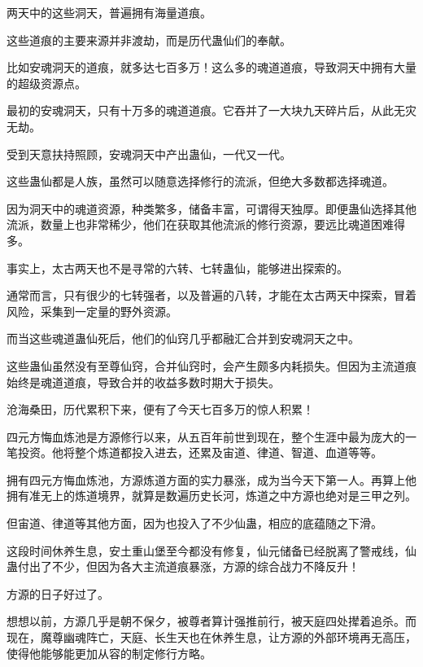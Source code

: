 
\begin{this_body}

两天中的这些洞天，普遍拥有海量道痕。

这些道痕的主要来源并非渡劫，而是历代蛊仙们的奉献。

比如安魂洞天的道痕，就多达七百多万！这么多的魂道道痕，导致洞天中拥有大量的超级资源点。

最初的安魂洞天，只有十万多的魂道道痕。它吞并了一大块九天碎片后，从此无灾无劫。

受到天意扶持照顾，安魂洞天中产出蛊仙，一代又一代。

这些蛊仙都是人族，虽然可以随意选择修行的流派，但绝大多数都选择魂道。

因为洞天中的魂道资源，种类繁多，储备丰富，可谓得天独厚。即便蛊仙选择其他流派，数量上也非常稀少，他们在获取其他流派的修行资源，要远比魂道困难得多。

事实上，太古两天也不是寻常的六转、七转蛊仙，能够进出探索的。

通常而言，只有很少的七转强者，以及普遍的八转，才能在太古两天中探索，冒着风险，采集到一定量的野外资源。

而当这些魂道蛊仙死后，他们的仙窍几乎都融汇合并到安魂洞天之中。

这些蛊仙虽然没有至尊仙窍，合并仙窍时，会产生颇多内耗损失。但因为主流道痕始终是魂道道痕，导致合并的收益多数时期大于损失。

沧海桑田，历代累积下来，便有了今天七百多万的惊人积累！

四元方悔血炼池是方源修行以来，从五百年前世到现在，整个生涯中最为庞大的一笔投资。他将整个炼道都投入进去，还累及宙道、律道、智道、血道等等。

拥有四元方悔血炼池，方源炼道方面的实力暴涨，成为当今天下第一人。再算上他拥有准无上的炼道境界，就算是数遍历史长河，炼道之中方源也绝对是三甲之列。

但宙道、律道等其他方面，因为也投入了不少仙蛊，相应的底蕴随之下滑。

这段时间休养生息，安土重山堡至今都没有修复，仙元储备已经脱离了警戒线，仙蛊付出了不少，但因为各大主流道痕暴涨，方源的综合战力不降反升！

方源的日子好过了。

想想以前，方源几乎是朝不保夕，被尊者算计强推前行，被天庭四处撵着追杀。而现在，魔尊幽魂阵亡，天庭、长生天也在休养生息，让方源的外部环境再无高压，使得他能够能更加从容的制定修行方略。


\end{this_body}

